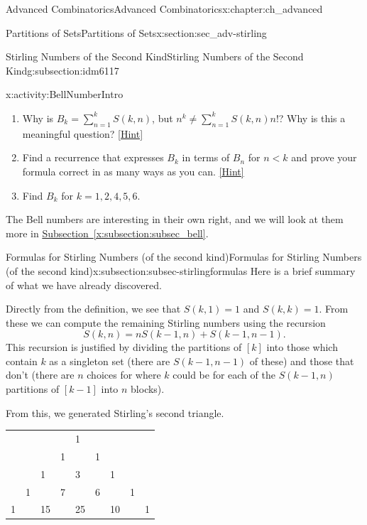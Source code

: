 \documentclass[oneside,10pt,]{book}
\numberwithin{equation}{chapter}
\newcommand{\lt}{<}
\begin{document}
\begin{chapterptx}{Advanced Combinatorics}{}{Advanced Combinatorics}{}{}{x:chapter:ch_advanced}
\begin{sectionptx}{Partitions of Sets}{}{Partitions of Sets}{}{}{x:section:sec_adv-stirling}
\begin{subsectionptx}{Stirling Numbers of the Second Kind}{}{Stirling Numbers of the Second Kind}{}{}{g:subsection:idm6117}
\begin{activity}{}{x:activity:BellNumberIntro}
\begin{enumerate}[font=\bfseries,label=(\alph*),ref=\alph*]
\item{}Why is \(B_k = \sum_{n=1}^{k} S(k,n)\), but \(n^k \ne \sum_{n=1}^k S(k,n)n!\)?  Why is this a meaningful question?%
\space\hspace*{0pt}\hfill{\tiny\hyperlink{g:hint:idm6477-back}{[Hint]}}\item{}Find a recurrence that expresses \(B_k\) in terms of \(B_n\) for \(n\lt  k\) and prove your formula correct in as many ways as you can.%
\space\hspace*{0pt}\hfill{\tiny\hyperlink{g:hint:idm6487-back}{[Hint]}}\item{}Find \(B_k\) for \(k=1,2,4,5,6\).%
\end{enumerate}
\end{activity}
The Bell numbers are interesting in their own right, and we will look at them more in \hyperref[x:subsection:subsec_bell]{Subsection~\ref{x:subsection:subsec_bell}}.%
\end{subsectionptx}
%
%
\typeout{************************************************}
\typeout{************************************************}
%
\begin{subsectionptx}{Formulas for Stirling Numbers (of the second kind)}{}{Formulas for Stirling Numbers (of the second kind)}{}{}{x:subsection:subsec-stirlingformulas}
Here is a brief summary of what we have already discovered.%
\par
Directly from the definition, we see that \(S(k,1) = 1\) and \(S(k,k) = 1\).  From these we can compute the remaining Stirling numbers using the recursion%
\begin{equation*}
S(k,n) = nS(k-1,n) + S(k-1, n-1).
\end{equation*}
This recursion is justified by dividing the partitions of \([k]\) into those which contain \(k\) as a singleton set (there are \(S(k-1, n-1)\) of these) and those that don't (there are \(n\) choices for where \(k\) could be for each of the \(S(k-1, n)\) partitions of \([k-1]\) into \(n\) blocks).%
\par
From this, we generated Stirling's second triangle.%
\begin{sidebyside}{1}{0.25}{0.25}{0}%
\begin{sbspanel}{0.5}%
{\centering%
\begin{tabular}{lllllllll}
&&&&1&&&&\tabularnewline[0pt]
&&&1&&1&&&\tabularnewline[0pt]
&&1&&3&&1&&\tabularnewline[0pt]
&1&&7&&6&&1&\tabularnewline[0pt]
1&&15&&25&&10&&1
\end{tabular}
}
\end{sbspanel}
\end{sidebyside}
\end{subsectionptx}
\end{sectionptx}
\end{chapterptx}
\end{document}
